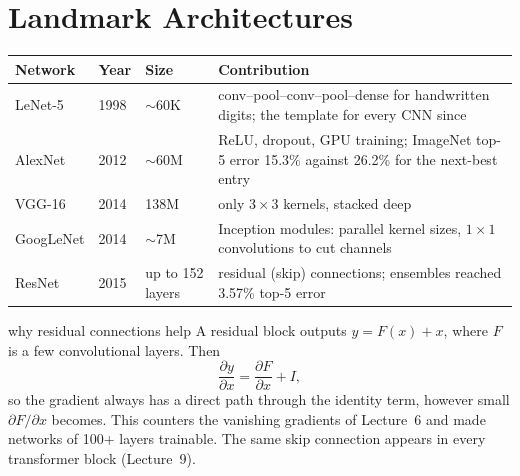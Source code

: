 \documentclass[11pt]{article}
\begin{document}
\section{Landmark Architectures}
\begin{center}\small\renewcommand{\arraystretch}{1.25}
\begin{tabularx}{\textwidth}{@{}l l l X@{}}\toprule
\textbf{Network} & \textbf{Year} & \textbf{Size} & \textbf{Contribution}\\\midrule
LeNet-5 & 1998 & $\sim$60K & conv--pool--conv--pool--dense for handwritten digits; the template for every CNN since\\
AlexNet & 2012 & $\sim$60M & ReLU, dropout, GPU training; ImageNet top-5 error 15.3\% against 26.2\% for the next-best entry\\
VGG-16 & 2014 & 138M & only $3\times3$ kernels, stacked deep\\
GoogLeNet & 2014 & $\sim$7M & Inception modules: parallel kernel sizes, $1\times1$ convolutions to cut channels\\
ResNet & 2015 & up to 152 layers & residual (skip) connections; ensembles reached 3.57\% top-5 error\\\bottomrule
\end{tabularx}\end{center}
\begin{derivation}{why residual connections help}
A residual block outputs $y=F(x)+x$, where $F$ is a few convolutional layers. Then
\[\frac{\partial y}{\partial x}=\frac{\partial F}{\partial x}+I,\]
so the gradient always has a direct path through the identity term, however small $\partial F/\partial x$ becomes. This counters the vanishing gradients of Lecture~6 and made networks of 100+ layers trainable. The same skip connection appears in every transformer block (Lecture~9).
\end{derivation}
\end{document}
